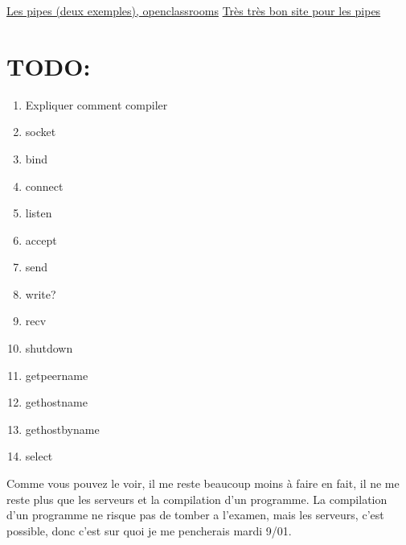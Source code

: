 \documentclass[a4paper]{article}
\begin{document}
\href{https://openclassrooms.com/courses/la-programmation-systeme-en-c-sous-unix/les-tubes}{Les pipes (deux exemples), openclassrooms}\newline
\href{http://www.zeitoun.net/articles/communication-par-tuyau/start}{Très très bon site pour les pipes}

\section{TODO:}
\begin{enumerate}
  \item Expliquer comment compiler
  \item socket
  \item bind
  \item connect
  \item listen
  \item accept
  \item send
  \item write?
  \item recv
  \item shutdown
  \item getpeername
  \item gethostname
  \item gethostbyname
  \item select
\end{enumerate}
Comme vous pouvez le voir, il me reste beaucoup moins à faire en fait, il ne me reste plus que les serveurs et la compilation d'un programme. La compilation d'un programme ne risque pas de tomber a l'examen, mais les serveurs, c'est possible, donc c'est sur quoi je me pencherais mardi 9/01.
\end{document}
